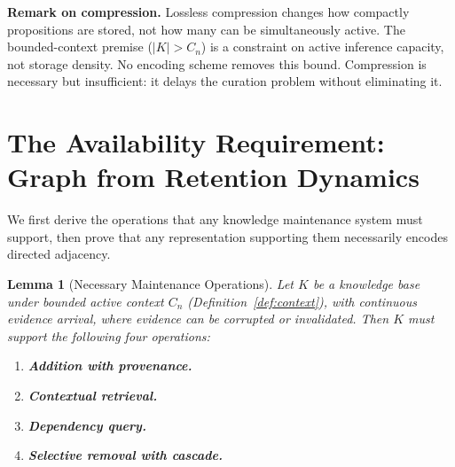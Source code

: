\documentclass[11pt]{article}
\newtheorem{lemma}[theorem]{Lemma}
\theoremstyle{definition}
\begin{document}
\textbf{Remark on compression.} Lossless compression changes how
compactly propositions are stored, not how many can be simultaneously
active. The bounded-context premise ($|K| > C_n$) is a constraint on
active inference capacity, not storage density. No encoding scheme removes this bound. Compression is necessary
but insufficient: it delays the curation problem without eliminating
it.

\section{The Availability Requirement: Graph from Retention Dynamics}
\label{sec:dynamics}

We first derive the operations that any knowledge maintenance system
must support, then prove that any representation supporting them
necessarily encodes directed adjacency.

\begin{lemma}[Necessary Maintenance Operations]
\label{lem:ops}
Let $K$ be a knowledge base under bounded active context $C_n$
(Definition~\ref{def:context}), with continuous evidence arrival, where
evidence can be corrupted or invalidated. Then $K$ must support the
following four operations:
\begin{enumerate}
\item[(i)] \textbf{Addition with provenance.}
\item[(ii)] \textbf{Contextual retrieval.}
\item[(iii)] \textbf{Dependency query.}
\item[(iv)] \textbf{Selective removal with cascade.}
\end{enumerate}
\end{lemma}
\end{document}
